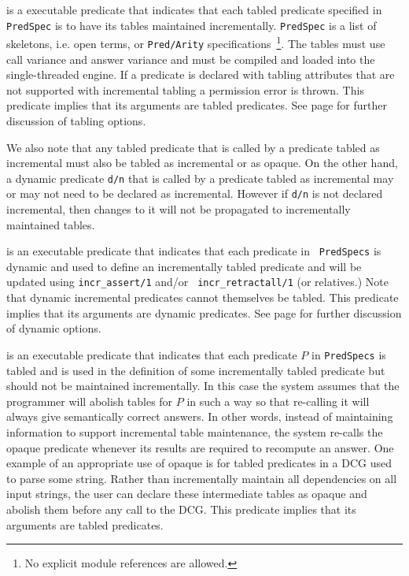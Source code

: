 \begin{description}

%
is a executable predicate that indicates that each tabled predicate
specified in {\tt PredSpec} is to have its tables maintained
incrementally.  {\tt PredSpec} is a list of skeletons, i.e. open
terms, or {\tt Pred/Arity} specifications~\footnote{No explicit module
  references are allowed.}.  The tables must use call variance and
answer variance and must be compiled and loaded into the
single-threaded engine.  If a predicate is declared with tabling
attributes that are not supported with incremental tabling a
permission error is thrown.  This predicate implies that its arguments
are tabled predicates.  See page \pageref{table-declaration} for
further discussion of tabling options.

We also note that any tabled predicate that is called by a predicate
tabled as incremental must also be tabled as incremental or as opaque.
On the other hand, a dynamic predicate {\tt d/n} that is called by a
predicate tabled as incremental may or may not need to be declared as
incremental.  However if {\tt d/n} is not declared incremental, then
changes to it will not be propagated to incrementally maintained
tables.

%
is an executable predicate that indicates that each predicate in {\tt
  PredSpecs} is dynamic and used to define an incrementally tabled
predicate and will be updated using {\tt incr\_assert/1} and/or {\tt
  incr\_retractall/1} (or relatives.)  Note that dynamic incremental
predicates cannot themselves be tabled.  This predicate implies that
its arguments are dynamic predicates.  See page
\pageref{dynamic-declaration} for further discussion of dynamic
options.

%
is an executable predicate that indicates that each predicate $P$ in
{\tt PredSpecs} is tabled and is used in the definition of some
incrementally tabled predicate but should not be maintained
incrementally.  In this case the system assumes that the programmer
will abolish tables for $P$ in such a way so that re-calling it will
always give semantically correct answers.  In other words, instead of
maintaining information to support incremental table maintenance, the
system re-calls the opaque predicate whenever its results are required
to recompute an answer.  One example of an appropriate use of opaque
is for tabled predicates in a DCG used to parse some string.  Rather
than incrementally maintain all dependencies on all input strings, the
user can declare these intermediate tables as opaque and abolish them
before any call to the DCG.  This predicate implies that its arguments
are tabled predicates.

\end{description}

